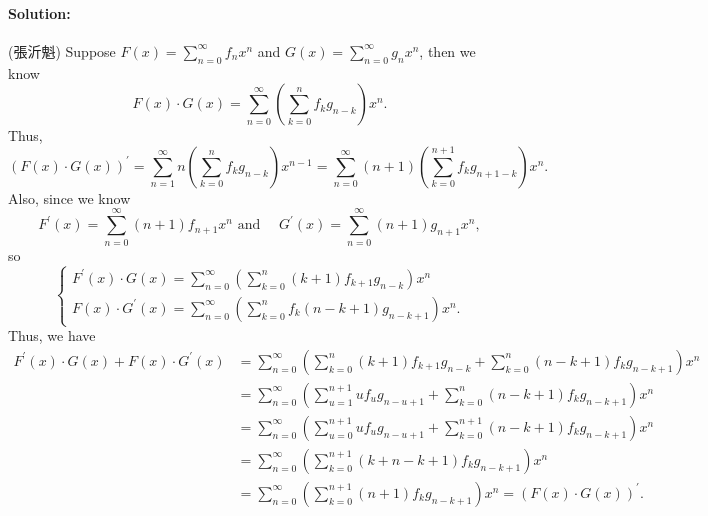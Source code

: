 \documentclass[a4paper,12pt]{article}
\begin{document}
\paragraph{Solution:} (張沂魁) Suppose \(F(x) = \sum_{n=0}^{\infty} f_n x^n \) and \(G(x) = \sum_{n=0}^{\infty} g_n x^n \), then we know
\[
	F(x) \cdot G(x) = \sum_{n=0}^{\infty} \left( \sum_{k=0}^n f_k g_{n-k}  \right) x^n.
\]  Thus, 
\[
	\left( F(x) \cdot G(x) \right)^{\prime} = \sum_{n=1}^{\infty} n \left( \sum_{k=0}^n f_k g_{n-k}  \right) x^{n-1} = \sum_{n=0}^{\infty} (n+1)\left( \sum_{k=0}^{n+1} f_k g_{n+1-k}  \right) x^n.    
\]
Also, since we know 
\[
	F^{\prime} (x) = \sum_{n=0}^{\infty} (n+1) f_{n+1} x^n \text{ and }  \quad G^{\prime} (x) = \sum_{n=0}^{\infty} (n+1)g_{n+1}x^n,  
\]
so 
\[  
\begin{cases}\displaystyle
	F^{\prime} (x) \cdot G(x) = \sum_{n=0}^{\infty} \left( \sum_{k=0}^n (k+1)f_{k+1} g_{n-k}  \right) x^n \\ \displaystyle
	 F(x) \cdot G^{\prime} (x) = \sum_{n=0}^{\infty} \left( \sum_{k=0}^{n} f_k (n - k + 1) g_{n-k+1}  \right) x^n.  
\end{cases} 
\]
Thus, we have 
\begin{align*}
	F^{\prime} (x) \cdot G(x) + F(x) \cdot G^{\prime} (x) &= \sum_{n=0}^{\infty} \left( \sum_{k=0}^n (k+1)f_{k+1}g_{n-k} + \sum_{k=0}^n (n-k+1)f_k g_{n-k+1}   \right) x^n \\
	&= \sum_{n=0}^{\infty} \left( \sum_{u=1}^{n+1} u f_u g_{n-u+1} + \sum_{k=0}^n (n-k+1)f_k g_{n-k+1}   \right) x^n \\
	&= \sum_{n=0}^{\infty} \left( \sum_{u=0}^{n+1} u f_u g_{n-u+1} + \sum_{k=0}^{n+1} (n-k+1)f_k g_{n-k+1}   \right) x^n \\
	&= \sum_{n=0}^{\infty} \left( \sum_{k=0}^{n+1} (k + n - k + 1) f_k g_{n-k+1}  \right) x^n \\
	&= \sum_{n=0}^{\infty} \left( \sum_{k=0}^{n+1}(n+1)f_k g_{n-k+1}  \right)x^n = \left( F(x) \cdot G(x) \right)^{\prime} .
\end{align*}
\end{document}
